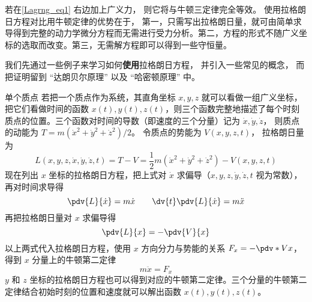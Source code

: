 若在\autoref{Lagrng_eq1} 右边加上广义力， 则它将与牛顿三定律完全等效。 使用拉格朗日方程对比用牛顿定律的优势在于， 第一，只需写出拉格朗日量，就可由简单求导得到完整的动力学微分方程而无需进行受力分析。第二，方程的形式不随广义坐标的选取而改变。第三，无需解方程即可以得到一些守恒量。

我们先通过一些例子来学习如何\textbf{使用}拉格朗日方程， 并引入一些常见的概念， 而把证明留到 “达朗贝尔原理” 以及 “哈密顿原理” 中。

\begin{example}{单个质点}\label{Lagrng_ex1}
若把一个质点作为系统，其直角坐标 $x,y,z$ 就可以看做一组广义坐标，把它们看做时间的函数 $x(t), y(t), z(t)$，则三个函数完整地描述了每个时刻质点的位置。三个函数对时间的导数（即速度的三个分量）记为 $\dot x, \dot y, \dot z$， 则质点的动能为 $T=m(\dot x^2+\dot y^2+\dot z^2)/2$。 令质点的势能为 $V(x,y,z,t)$， 拉格朗日量为
\begin{equation}
L(x,y,z, \dot x, \dot y, \dot z, t) = T-V = \frac12 m(\dot x^2+\dot y^2+\dot z^2) - V(x,y,z,t)
\end{equation}
现在列出 $x$ 坐标的拉格朗日方程，把上式对 $\dot x$ 求偏导（$x, y,z, \dot y, \dot z, t$ 视为常数），再对时间求导得
\begin{equation}
\pdv{L}{\dot x} = m\dot x
\qquad
\dv{t} \pdv{L}{\dot x} = m\ddot x
\end{equation}
再把拉格朗日量对 $x$ 求偏导得
\begin{equation}
\pdv{L}{x} = -\pdv{V}{x}
\end{equation}
以上两式代入拉格朗日方程，使用 $x$ 方向分力与势能的关系 $F_x = -\pdv*{V}{x}$， 得到 $x$ 分量上的牛顿第二定律
\begin{equation}
m\ddot x = F_x
\end{equation}
$y$ 和 $z$ 坐标的拉格朗日方程也可以得到对应的牛顿第二定律。三个分量的牛顿第二定律结合初始时刻的位置和速度就可以解出函数 $x(t), y(t), z(t)$。 
\end{example}

